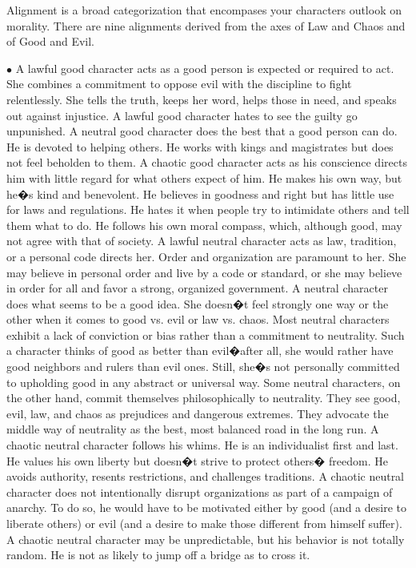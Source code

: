 Alignment is a broad categorization that encompases your characters outlook on morality.  There are nine alignments derived from the axes of Law and Chaos and of Good and Evil.
\vspace*{10pt}
\begin{list}{$\bullet$}{\itemspace}
	 A lawful good character acts as a good person is expected or required to act. She combines a commitment to oppose evil with the discipline to fight relentlessly. She tells the truth, keeps her word, helps those in need, and speaks out against injustice. A lawful good character hates to see the guilty go unpunished. 
	 A neutral good character does the best that a good person can do. He is devoted to helping others. He works with kings and magistrates but does not feel beholden to them.
	 A chaotic good character acts as his conscience directs him with little regard for what others expect of him. He makes his own way, but he�s kind and benevolent. He believes in goodness and right but has little use for laws and regulations. He hates it when people try to intimidate others and tell them what to do. He follows his own moral compass, which, although good, may not agree with that of society. 
	 A lawful neutral character acts as law, tradition, or a personal code directs her. Order and organization are paramount to her. She may believe in personal order and live by a code or standard, or she may believe in order for all and favor a strong, organized government. 
	 A neutral character does what seems to be a good idea. She doesn�t feel strongly one way or the other when it comes to good vs. evil or law vs. chaos. Most neutral characters exhibit a lack of conviction or bias rather than a commitment to neutrality. Such a character thinks of good as better than evil�after all, she would rather have good neighbors and rulers than evil ones. Still, she�s not personally committed to upholding good in any abstract or universal way. Some neutral characters, on the other hand, commit themselves philosophically to neutrality. They see good, evil, law, and chaos as prejudices and dangerous extremes. They advocate the middle way of neutrality as the best, most balanced road in the long run. 
	 A chaotic neutral character follows his whims. He is an individualist first and last. He values his own liberty but doesn�t strive to protect others� freedom. He avoids authority, resents restrictions, and challenges traditions. A chaotic neutral character does not intentionally disrupt organizations as part of a campaign of anarchy. To do so, he would have to be motivated either by good (and a desire to liberate others) or evil (and a desire to make those different from himself suffer). A chaotic neutral character may be unpredictable, but his behavior is not totally random. He is not as likely to jump off a bridge as to cross it. 

\end{list}
